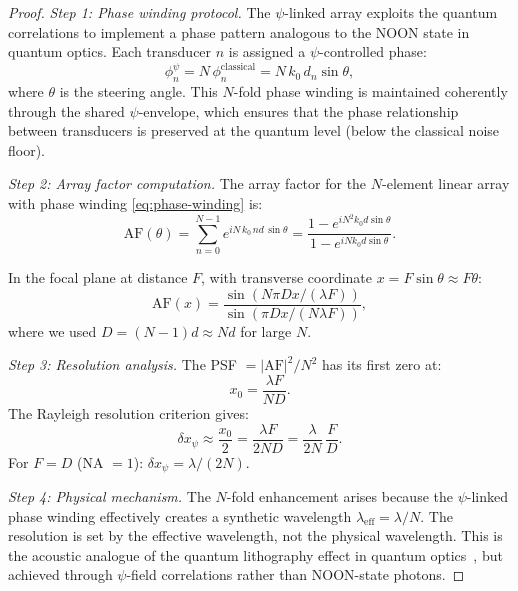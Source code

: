 \documentclass[aps,prl,twocolumn,superscriptaddress,showpacs]{revtex4-2}
\theoremstyle{definition}
\begin{document}
\begin{proof}
\textit{Step 1: Phase winding protocol.}
The $\psi$-linked array exploits the quantum correlations to implement
a phase pattern analogous to the NOON state in quantum optics. Each
transducer $n$ is assigned a $\psi$-controlled phase:
\begin{equation}
\phi_n^\psi = N\,\phi_n^{\mathrm{classical}} = N\,k_0\,d_n\sin\theta,
\label{eq:phase-winding}
\end{equation}
where $\theta$ is the steering angle. This $N$-fold phase winding is
maintained coherently through the shared $\psi$-envelope, which ensures
that the phase relationship between transducers is preserved at the
quantum level (below the classical noise floor).

\textit{Step 2: Array factor computation.}
The array factor for the $N$-element linear array with phase winding
\eqref{eq:phase-winding} is:
\begin{equation}
\mathrm{AF}(\theta) = \sum_{n=0}^{N-1} e^{iN\,k_0\,nd\,\sin\theta}
= \frac{1 - e^{iN^2 k_0 d\sin\theta}}{1 - e^{iN k_0 d\sin\theta}}.
\label{eq:array-factor}
\end{equation}

In the focal plane at distance $F$, with transverse coordinate
$x = F\sin\theta \approx F\theta$:
\begin{equation}
\mathrm{AF}(x) = \frac{\sin(N\pi Dx/(\lambda F))}{\sin(\pi Dx/(N\lambda F))},
\label{eq:af-focal}
\end{equation}
where we used $D = (N-1)d \approx Nd$ for large $N$.

\textit{Step 3: Resolution analysis.}
The PSF $= |\mathrm{AF}|^2/N^2$ has its first zero at:
\begin{equation}
x_0 = \frac{\lambda F}{ND}.
\label{eq:first-zero}
\end{equation}
The Rayleigh resolution criterion gives:
\begin{equation}
\delta x_\psi \approx \frac{x_0}{2} = \frac{\lambda F}{2ND}
= \frac{\lambda}{2N}\,\frac{F}{D}.
\label{eq:rayleigh-psi}
\end{equation}
For $F = D$ (NA $= 1$): $\delta x_\psi = \lambda/(2N)$.

\textit{Step 4: Physical mechanism.}
The $N$-fold enhancement arises because the $\psi$-linked phase
winding effectively creates a synthetic wavelength
$\lambda_{\mathrm{eff}} = \lambda/N$. The resolution is set by the
effective wavelength, not the physical wavelength. This is the
acoustic analogue of the quantum lithography effect in quantum
optics~\cite{Boto2000,DAngelo2001}, but achieved through $\psi$-field
correlations rather than NOON-state photons.
\end{proof}
\end{document}
